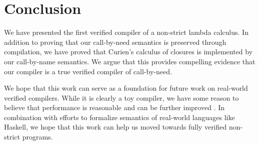 \section{Conclusion} \label{sec:conclusion}

We have presented the first verified compiler of a non-strict lambda calculus.
In addition to proving that our call-by-need semantics is preserved through
compilation, we have proved that Curien's calculus of closures is implemented by
our call-by-name semantics. We argue that this provides compelling evidence that
our compiler is a true verified compiler of call-by-need.

We hope that this work can serve as a foundation for future work on real-world
verified compilers. While it is clearly a toy compiler, we have some reason to
believe that performance is reasonable and can be further improved \cite{cem}.
In combination with efforts to formalize semantics of real-world languages like
Haskell, we hope that this work can help us moved towards fully verified
non-strict programs.
